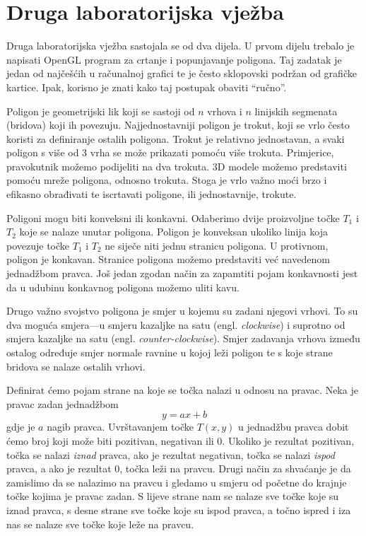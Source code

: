 \documentclass[a4paper,12pt]{article}
\begin{document}
\section{Druga laboratorijska vježba}

Druga laboratorijska vježba sastojala se od dva dijela. U prvom dijelu trebalo je napisati OpenGL
program za crtanje i popunjavanje poligona. Taj zadatak je jedan od najčešćih u računalnoj grafici
te je često sklopovski podržan od grafičke kartice. Ipak, korisno je znati kako taj postupak obaviti
``ručno''.

Poligon je geometrijski lik koji se sastoji od $n$ vrhova i $n$ linijskih segmenata (bridova) koji ih povezuju. Najjednostavniji poligon je trokut, koji se vrlo često koristi za definiranje ostalih poligona.
Trokut je relativno jednostavan, a svaki poligon s više od 3 vrha se može prikazati pomoću više
trokuta. Primjerice, pravokutnik možemo podijeliti na dva trokuta. 3D modele možemo predstaviti
pomoću mreže poligona, odnosno trokuta. Stoga je vrlo važno moći brzo i efikasno obrađivati te
iscrtavati poligone, ili jednostavnije, trokute.

Poligoni mogu biti konveksni ili konkavni. Odaberimo dvije proizvoljne točke $T_1$ i $T_2$ koje se
nalaze unutar poligona. Poligon je konveksan ukoliko linija koja povezuje točke $T_1$ i $T_2$ ne siječe
niti jednu stranicu poligona. U protivnom, poligon je konkavan. Stranice poligona možemo predstaviti već navedenom jednadžbom pravca.
Još jedan zgodan način za zapamtiti pojam konkavnosti jest da u udubinu konkavnog poligona možemo uliti kavu.

Drugo važno svojstvo poligona je smjer u kojemu su zadani njegovi vrhovi. To su dva moguća smjera---u smjeru kazaljke na satu
(engl. {\sl clockwise}) i suprotno od smjera kazaljke na satu (engl. {\sl counter-clockwise}).
Smjer zadavanja vrhova između ostalog određuje smjer normale ravnine u kojoj leži poligon te s koje
strane bridova se nalaze ostalih vrhovi.

Definirat ćemo pojam strane na koje se točka nalazi u odnosu na pravac. Neka je pravac zadan
jednadžbom
\[
  y = ax + b
\]
gdje je $a$ nagib pravca. Uvrštavanjem točke $T(x, y)$ u jednadžbu pravca dobit ćemo broj koji
može biti pozitivan, negativan ili 0. Ukoliko je rezultat pozitivan, točka se nalazi {\sl iznad}
pravca, ako je rezultat negativan, točka se nalazi {\sl ispod} pravca, a ako je rezultat 0, točka
leži na pravcu. Drugi način za shvaćanje je da zamislimo da se nalazimo na pravcu i gledamo u
smjeru od početne do krajnje točke kojima je pravac zadan. S lijeve strane nam se nalaze sve točke
koje su iznad pravca, s desne strane sve točke koje su ispod pravca, a točno ispred i iza nas se
nalaze sve točke koje leže na pravcu.
\end{document}
